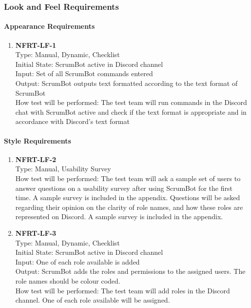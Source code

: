 \documentclass[12pt, titlepage]{article}
\begin{document}
\subsubsection{Look and Feel Requirements}
\paragraph{Appearance Requirements}
\begin{enumerate}
    \item{\textbf{NFRT-LF-1}}\\
    Type: Manual, Dynamic, Checklist\\
    Initial State: ScrumBot active in Discord channel\\
    Input: Set of all ScrumBot commands entered\\
    Output: ScrumBot outputs text formatted according to the text format of ScrumBot\\
    How test will be performed: The test team will run commands in the Discord chat with ScrumBot active and check if the text format is appropriate and in accordance with Discord's text format
\end{enumerate}

\paragraph{Style Requirements}
\begin{enumerate}
    \item{\textbf{NFRT-LF-2}}\\
    Type: Manual, Usability Survey\\
    How test will be performed: The test team will ask a sample set of users to answer questions on a usability survey after using ScrumBot for the first time. A sample survey is included in the appendix. Questions will be asked regarding their opinion on the clarity of role names, and how these roles are represented on Discord. A sample survey is included in the appendix.
    
    \item{\textbf{NFRT-LF-3}}\\
    Type: Manual, Dynamic, Checklist\\
    Initial State: ScrumBot active in Discord channel\\
    Input: One of each role available is added\\
    Output: ScrumBot adds the roles and permissions to the assigned users. The role names  should be colour coded.\\
    How test will be performed: The test team will add roles in the Discord channel. One of each role available will be assigned.
\end{enumerate}
\end{document}
